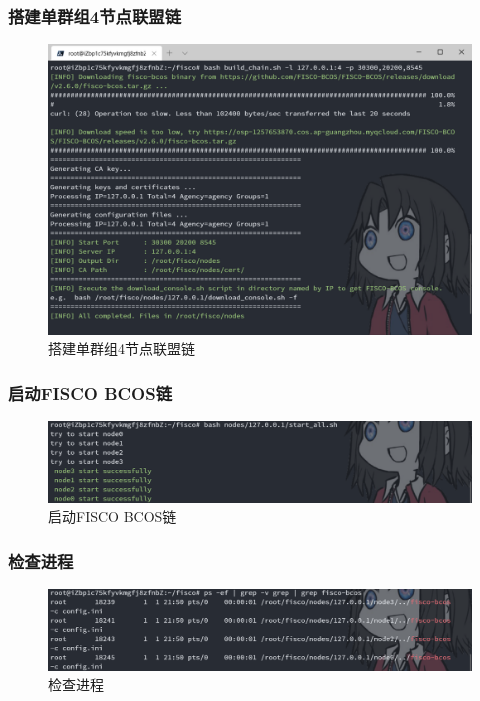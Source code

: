 \documentclass[a4paper, 11pt]{article}
\begin{document}
\subsubsection{搭建单群组4节点联盟链}
\begin{figure}[H]
      \centering
      \includegraphics[width = 0.8 \textwidth]{nodes.png}
      \caption{搭建单群组4节点联盟链}
\end{figure}

\subsubsection{启动FISCO BCOS链}
\begin{figure}[H]
      \centering
      \includegraphics[width = 0.8 \textwidth]{start_all.png}
      \caption{启动FISCO BCOS链}
\end{figure}

\subsubsection{检查进程}
\begin{figure}[H]
      \centering
      \includegraphics[width = 0.8 \textwidth]{ps.png}
      \caption{检查进程}
\end{figure}
\end{document}
